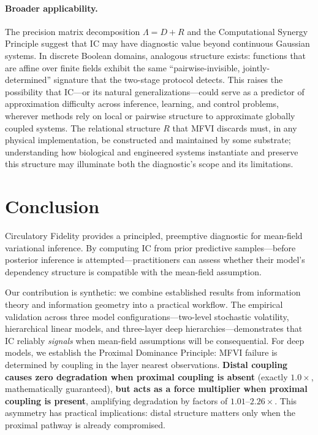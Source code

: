 \documentclass[10pt]{article} %
\theoremstyle{plain}
\theoremstyle{definition}
\begin{document}
\paragraph{Broader applicability.}
The precision matrix decomposition $\Lambda = D + R$ and the Computational Synergy Principle 
suggest that IC may have diagnostic value beyond continuous Gaussian systems. In discrete 
Boolean domains, analogous structure exists: functions that are affine over finite fields 
exhibit the same ``pairwise-invisible, jointly-determined'' signature that the two-stage 
protocol detects. This raises the possibility that IC---or its natural generalizations---could 
serve as a predictor of approximation difficulty across inference, learning, and control 
problems, wherever methods rely on local or pairwise structure to approximate globally 
coupled systems. The relational structure $R$ that MFVI discards must, in any physical 
implementation, be constructed and maintained by some substrate; understanding how biological 
and engineered systems instantiate and preserve this structure may illuminate both the 
diagnostic's scope and its limitations.

\section{Conclusion}
\label{sec:conclusion}

Circulatory Fidelity provides a principled, preemptive diagnostic for mean-field variational inference. By computing IC from prior predictive samples---before posterior inference is attempted---practitioners can assess whether their model's dependency structure is compatible with the mean-field assumption.

Our contribution is synthetic: we combine established results from information theory \citep{kvalseth1987entropy,vinh2010information} and information geometry \citep{amari2016information} into a practical workflow. The empirical validation across three model configurations---two-level stochastic volatility, hierarchical linear models, and three-layer deep hierarchies---demonstrates that IC reliably \emph{signals} when mean-field assumptions will be consequential. For deep models, we establish the Proximal Dominance Principle: MFVI failure is determined by coupling in the layer nearest observations. \textbf{Distal coupling causes zero degradation when proximal coupling is absent} (exactly $1.0\times$, mathematically guaranteed), \textbf{but acts as a force multiplier when proximal coupling is present}, amplifying degradation by factors of $1.01$--$2.26\times$. This asymmetry has practical implications: distal structure matters only when the proximal pathway is already compromised.
\end{document}
